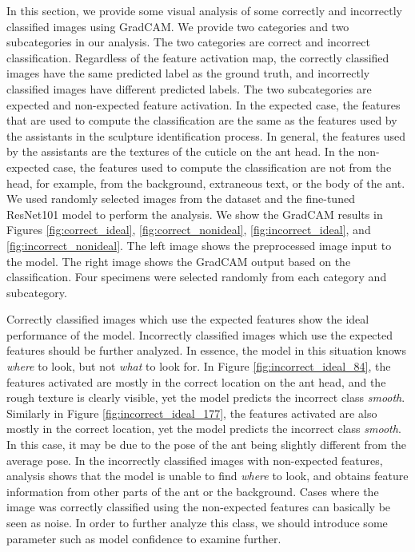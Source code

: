 \documentclass{aci}
\numberwithin{equation}{section}
\begin{document}
In this section, we provide some visual analysis of some correctly and
incorrectly classified images using GradCAM. We provide two categories and two
subcategories in our analysis. The two categories are correct and incorrect
classification. Regardless of the feature activation map, the correctly
classified images have the same predicted label as the ground truth, and
incorrectly classified images have different predicted labels. The two
subcategories are expected and non-expected feature activation. In the expected
case, the features that are used to compute the classification are the same as
the features used by the assistants in the sculpture identification process. In
general, the features used by the assistants are the textures of the cuticle on
the ant head. In the non-expected case, the features used to compute the
classification are not from the head, for example, from the background,
extraneous text, or the body of the ant. We used randomly selected images from
the dataset and the fine-tuned ResNet101 model to perform the analysis. We show
the GradCAM results in Figures \ref{fig:correct_ideal},
\ref{fig:correct_nonideal}, \ref{fig:incorrect_ideal}, and
\ref{fig:incorrect_nonideal}. The left image shows the preprocessed image input
to the model. The right image shows the GradCAM output based on the
classification. Four specimens were selected randomly from each category and
subcategory.

Correctly classified images which use the expected features show the ideal
performance of the model. Incorrectly classified images which use the expected
features should be further analyzed. In essence, the model in this situation
knows \textit{where} to look, but not \textit{what} to look for. In Figure
\ref{fig:incorrect_ideal_84}, the features activated are mostly in the correct
location on the ant head, and the rough texture is clearly visible, yet the
model predicts the incorrect class \textit{smooth}. Similarly in Figure
\ref{fig:incorrect_ideal_177}, the features activated are also mostly in the
correct location, yet the model predicts the incorrect class \textit{smooth}. In
this case, it may be due to the pose of the ant being slightly different from
the average pose. In the incorrectly classified images with non-expected
features, analysis shows that the model is unable to find \textit{where} to
look, and obtains feature information from other parts of the ant or the
background. Cases where the image was correctly classified using the
non-expected features can basically be seen as noise. In order to further
analyze this class, we should introduce some parameter such as model confidence
to examine further.
\end{document}
